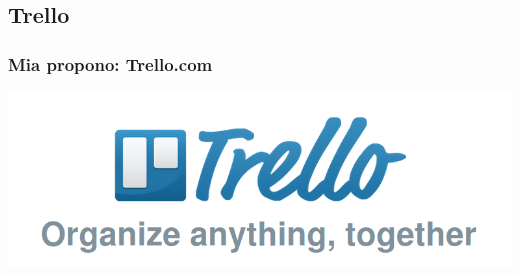 \subsection{Trello}
   
  \begin{frame}
    \frametitle{Mia propono: Trello.com}
    \begin{center}
    	\includegraphics[scale=0.4]{bildoj/trello}
    \end{center}    
  \end{frame}
  
